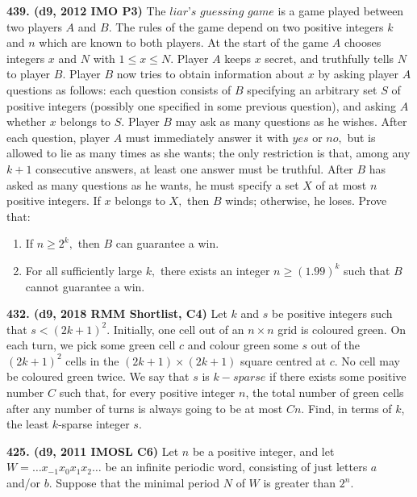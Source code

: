 \documentclass{article}
\begin{document}
\textbf{439. (\color{red}d9\color{black}, 2012 IMO P3)} The $\textit{liar's guessing game}$ is a game played between two players $A$ and $B.$ The rules of the game depend on two positive integers $k$ and $n$ which are known to both players.
\smallbreak
At the start of the game $A$ chooses integers $x$ and $N$ with $1 \leq x \leq N.$ Player $A$ keeps $x$ secret, and truthfully tells $N$ to player $B.$ Player $B$ now tries to obtain information about $x$ by asking player $A$ questions as follows: each question consists of $B$ specifying an arbitrary set $S$ of positive integers (possibly one specified in some previous question), and asking $A$ whether $x$ belongs to $S.$ Player $B$ may ask as many questions as he wishes. After each question, player $A$ must immediately answer it with $\textit{yes}$ or $\textit{no},$ but is allowed to lie as many times as she wants; the only restriction is that, among any $k + 1$ consecutive answers, at least one answer must be truthful.
\smallbreak
After $B$ has asked as many questions as he wants, he must specify a set $X$ of at most $n$ positive integers. If $x$ belongs to $X,$ then $B$ winds; otherwise, he loses. Prove that:
\begin{enumerate}
        \item If $n \geq 2^k,$ then $B$ can guarantee a win.
        \item For all sufficiently large $k,$ there exists an integer $n \geq (1.99)^k$ such that $B$ cannot guarantee a win.
\end{enumerate}

\textbf{432. (\color{red}d9\color{black}, 2018 RMM Shortlist, C4)} Let $k$ and $s$ be positive integers such that $s<(2k + 1)^2$. Initially, one cell out of an $n \times n$ grid is coloured green. On each turn, we pick some green cell $c$ and colour green some $s$ out of the $(2k + 1)^2$ cells in the $(2k + 1) \times (2k + 1)$ square centred at $c$. No cell may be coloured green twice. We say that $s$ is $k-sparse$ if there exists some positive number $C$ such that, for every positive integer $n$, the total number of green cells after any number of turns is always going to be at most $Cn$. Find, in terms of $k$, the least $k$-sparse integer $s$.


\textbf{425. (\color{red}d9\color{black}, 2011 IMOSL C6)} Let $n$ be a positive integer, and let $W = \ldots x_{-1}x_0x_1x_2 \ldots$ be an infinite periodic word, consisting of just letters $a$ and/or $b$. Suppose that the minimal period $N$ of $W$ is greater than $2^n$.
\end{document}
